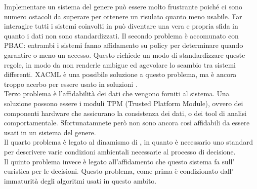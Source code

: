 Implementare un sistema del genere può essere molto frustrante poiché ci sono numero ostacoli da 
superare per ottenere un risulato quanto meno usabile.
Far interagire tutti i sistemi coinvolti in \radac può diventare una vera e propria sfida in quanto
i dati non sono standardizzati.
Il secondo problema è accomunato con PBAC: entrambi i sistemi fanno affidamento su policy per determinare quando garantire o meno un accesso. Questo richiede un modo 
di standardizzare queste regole, in modo da non renderle ambigue ed agevolare lo scambio tra sistemi differenti. XACML è una possibile soluzione a questo problema, ma è ancora troppo 
acerbo per essere usato in soluzioni \radac.\\
Terzo problema è l'affidabilità dei dati che vengono forniti al sistema. Una soluzione possono essere i moduli TPM (Trusted Platform Module), ovvero dei componenti hardware che assicurano la consistenza dei dati, o dei tool di analisi comportamentale. Sfortunatamnete però non sono ancora così affidabili da essere usati in un sistema del genere.\\
Il quarto problema è legato al dinamismo di \radac, in quanto è necessario uno 
standard per descrivere varie condizioni ambientali necessarie al processo
di decisione.\\
Il quinto problema invece è legato all'affidamento che questo sistema fa sull'
euristica per le decisioni. Questo problema, come prima è condizionato dall'
immaturità degli algoritmi usati in questo ambito.

